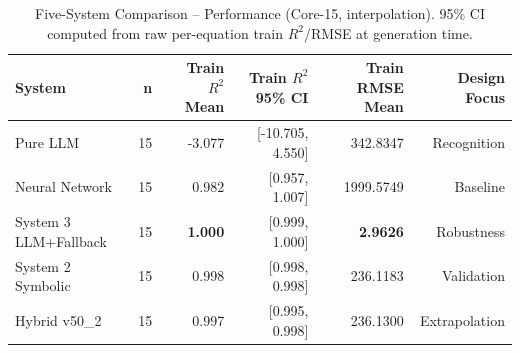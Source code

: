\documentclass[twoside,11pt]{article}
\begin{document}

\begin{table}[t]
\centering
\caption{Five-System Comparison -- Performance (Core-15, interpolation).
  95\% CI computed from raw per-equation train $R^2$/RMSE at generation time.}
\label{tab:five_systems_performance}
\begin{tabular}{lrrrrr}
\toprule
\textbf{System} & \textbf{n} & \textbf{Train $R^2$ Mean}
  & \textbf{Train $R^2$ 95\% CI} & \textbf{Train RMSE Mean}
  & \textbf{Design Focus} \\
\midrule
Pure LLM & 15 & -3.077 & [-10.705, 4.550] & 342.8347 & Recognition \\
Neural Network & 15 & 0.982 & [0.957, 1.007] & 1999.5749 & Baseline \\
System 3 LLM+Fallback & 15 & \textbf{1.000} & [0.999, 1.000] & \textbf{2.9626} & Robustness \\
System 2 Symbolic & 15 & 0.998 & [0.998, 0.998] & 236.1183 & Validation \\
Hybrid v50\_2 & 15 & 0.997 & [0.995, 0.998] & 236.1300 & Extrapolation \\
\bottomrule
\end{tabular}
\end{table}
\end{document}
